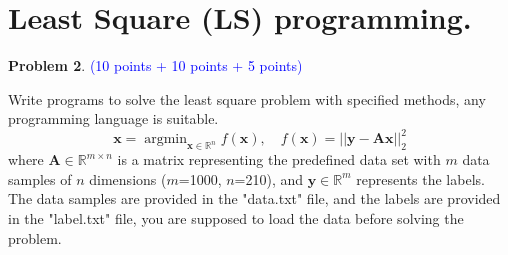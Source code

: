 \documentclass[english,onecolumn]{IEEEtran}
\newcommand{\Rbb}{\mathbb{R}}
\begin{document}
\section{Least Square (LS) programming.}
\noindent\textbf{Problem 2}. \textcolor{blue}{(10 points + 10 points + 5 points)}

Write programs to solve the least square problem with specified methods, any programming language is suitable.
$$
\mathbf{x} = \mathop{\arg\min}_{\mathbf{x} \in \Rbb^n} f(\mathbf{x}), \quad f(\mathbf{x}) = ||\mathbf{y}-\mathbf{A}\mathbf{x}||_2^2
$$
where $\mathbf{A} \in \Rbb^{m \times n}$ is a matrix representing the predefined data set with $m$ data samples of $n$ dimensions ($m$=1000, $n$=210), and $\mathbf{y} \in \Rbb^m$ represents the labels. The data samples are provided in the "data.txt" file, and the labels are provided in the "label.txt" file, you are supposed to load the data before solving the problem.
\end{document}
